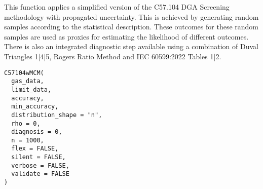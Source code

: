 \documentclass[a4paper]{book}
\begin{document}
%
\begin{Description}
This function applies a simplified version of the C57.104 DGA Screening methodology with propagated uncertainty. This is achieved by generating random samples according to the statistical description. These outcomes for these random samples are used as proxies for estimating the likelihood of different outcomes. There is also an integrated diagnostic step available using a combination of Duval Triangles 1|4|5, Rogers Ratio Method and IEC 60599:2022 Tables 1|2.
\end{Description}
%
\begin{Usage}
\begin{verbatim}
C57104wMCM(
  gas_data,
  limit_data,
  accuracy,
  min_accuracy,
  distribution_shape = "n",
  rho = 0,
  diagnosis = 0,
  n = 1000,
  flex = FALSE,
  silent = FALSE,
  verbose = FALSE,
  validate = FALSE
)
\end{verbatim}
\end{Usage}
%
\end{document}
